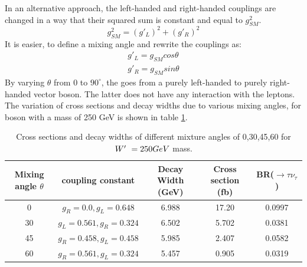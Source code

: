 In an alternative approach, the left-handed and right-handed couplings are changed in a way that their squared sum is constant and equal to $g_{SM}^2$.
\begin{equation}
g_{SM}^2 = (g'_L)^2 +  (g'_R)^2 
\end{equation}
It is easier, to define a mixing angle and rewrite the couplings as:
\begin{eqnarray}
g'_L  = g_{SM} cos\theta \\
g'_R  = g_{SM} sin\theta
\end{eqnarray}
By varying $\theta$ from 0 to $ 90^\circ $, the \wprime goes from a purely left-handed to purely right-handed vector boson. The latter \wprime does not have any interaction with the leptons. 
The variation of cross sections and decay widths due to various mixing angles, for \wprime boson with a mass of 250 GeV is shown in table \ref{tab:mixingAngle}.
%
\begin{table}[htb]
	\centering
	\begin{tabular}{|c|c|c|c|c|}
		\hline 
		Mixing angle $\theta$  & coupling constant & Decay Width (GeV)  &  Cross section (fb) & BR(\wprime $\rightarrow \tau \nu_\tau$) \\
		\hline 
	
               0  & $g_R=0.0, g_L=0.648$ & 6.988  & 17.20 &0.0997 \\
               30 & $g_L=0.561,g_R=0.324$ & 6.502  & 5.702 &0.0381\\
               45 & $g_R=0.458,g_L=0.458$ & 5.985  & 2.407 & 0.0582\\
               60 & $g_R=0.561,g_L=0.324$ & 5.457  & 0.905 &0.0319\\

		\hline
	\end{tabular}
	\caption{Cross sections and decay widths of different mixture angles of 0,30,45,60 for $W^\prime~ =250 GeV$ mass. \label{tab:mixingAngle} }
\end{table}



